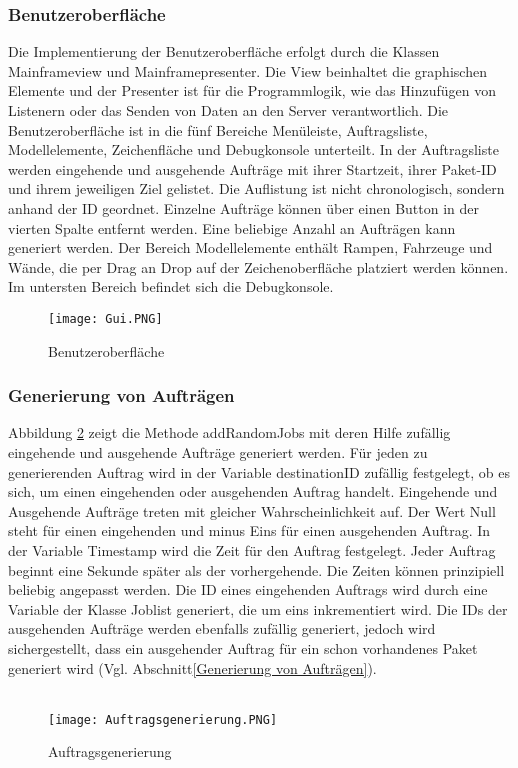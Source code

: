 \subsubsection{Benutzeroberfläche}
Die Implementierung der Benutzeroberfläche erfolgt durch die Klassen Mainframeview und Mainframepresenter. Die View beinhaltet die graphischen Elemente und der Presenter ist für die Programmlogik, wie das Hinzufügen von Listenern oder das Senden von Daten an den Server verantwortlich. Die Benutzeroberfläche ist in die fünf Bereiche Menüleiste, Auftragsliste, Modellelemente, Zeichenfläche und Debugkonsole unterteilt. In der Auftragsliste werden eingehende und ausgehende Aufträge mit ihrer Startzeit, ihrer Paket-ID und ihrem jeweiligen Ziel gelistet. Die Auflistung ist nicht chronologisch, sondern anhand der ID geordnet. Einzelne Aufträge können über einen Button in der vierten Spalte entfernt werden. Eine beliebige Anzahl an Aufträgen kann generiert werden. Der Bereich Modellelemente enthält Rampen, Fahrzeuge und Wände, die per Drag an Drop auf der Zeichenoberfläche platziert werden können. Im untersten Bereich befindet sich die Debugkonsole. 
\begin{figure}[h!]
	\centering
		\texttt{[image: Gui.PNG]}        
		\caption{Benutzeroberfläche}
	\label{GUIIMPL}
\end{figure}
\subsubsection{Generierung von Aufträgen}
Abbildung \ref{AGEN} zeigt die Methode addRandomJobs mit deren Hilfe zufällig eingehende und ausgehende Aufträge generiert werden. Für jeden zu generierenden Auftrag wird in der Variable destinationID zufällig festgelegt, ob es sich, um einen eingehenden oder ausgehenden Auftrag handelt.
Eingehende und Ausgehende Aufträge treten mit gleicher Wahrscheinlichkeit auf. Der Wert Null steht für einen eingehenden und minus Eins für einen ausgehenden Auftrag. In der Variable Timestamp wird die Zeit für den Auftrag festgelegt. Jeder Auftrag beginnt eine Sekunde später als der vorhergehende. Die Zeiten können prinzipiell beliebig angepasst werden. Die ID eines eingehenden Auftrags wird durch eine Variable der Klasse Joblist generiert, die um eins inkrementiert wird. Die IDs der ausgehenden Aufträge werden ebenfalls zufällig generiert, jedoch wird sichergestellt, dass ein ausgehender Auftrag für ein schon vorhandenes Paket generiert wird (Vgl. Abschnitt\ref{Generierung von Aufträgen}).
\\\\  
\begin{figure}[h!]
	\centering
		\texttt{[image: Auftragsgenerierung.PNG]}        
		\caption{Auftragsgenerierung}
	\label{AGEN}
\end{figure}
\\\\
